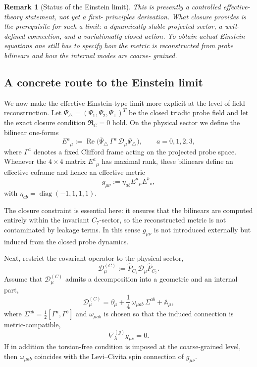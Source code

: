 \documentclass[12pt,a4paper]{article}
\newtheorem*{remark}{Remark}
\begin{document}
\begin{remark}[Status of the Einstein limit]
This is presently a controlled effective-theory statement, not yet a first-
principles derivation.
What closure provides is the prerequisite for such a limit: a dynamically
stable projected sector, a well-defined connection, and a variationally
closed action.
To obtain actual Einstein equations one still has to specify how the metric
is reconstructed from probe bilinears and how the internal modes are coarse-
grained.
\end{remark}


\subsection*{A concrete route to the Einstein limit}

We now make the effective Einstein-type limit more explicit at the level of
field reconstruction. Let $\Psi_\triangle=(\Psi_1,\Psi_2,\Psi_\perp)^T$ be the
closed triadic probe field and let the exact closure condition
$\mathfrak R_C=0$ hold. On the physical sector we define the bilinear one-forms
\[
  E^a{}_{\mu}
  := \operatorname{Re}\bigl(\bar\Psi_\triangle \,\Gamma^a \, \mathcal D_\mu
  \Psi_\triangle\bigr),
  \qquad a=0,1,2,3,
\]
where $\Gamma^a$ denotes a fixed Clifford frame acting on the projected probe
space. Whenever the $4\times 4$ matrix $E^a{}_{\mu}$ has maximal rank, these
bilinears define an effective coframe and hence an effective metric
\[
  g_{\mu\nu}
  := \eta_{ab} E^a{}_{\mu} E^b{}_{\nu},
\]
with $\eta_{ab}=\operatorname{diag}(-1,1,1,1)$.

The closure constraint is essential here: it ensures that the bilinears are
computed entirely within the invariant $C_7$-sector, so the reconstructed
metric is not contaminated by leakage terms. In this sense $g_{\mu\nu}$ is not
introduced externally but induced from the closed probe dynamics.

Next, restrict the covariant operator to the physical sector,
\[
  \mathcal D^{(C)}_\mu := \hat P_{C_7}\mathcal D_\mu \hat P_{C_7}.
\]
Assume that $\mathcal D^{(C)}_\mu$ admits a decomposition into a geometric and an
internal part,
\[
  \mathcal D^{(C)}_\mu
  = \partial_\mu + \frac14 \, \omega_{\mu ab}\,\Sigma^{ab} + \mathbb A_\mu,
\]
where $\Sigma^{ab}=\frac12[\Gamma^a,\Gamma^b]$ and $\omega_{\mu ab}$ is chosen so
that the induced connection is metric-compatible,
\[
  \nabla^{(g)}_\lambda g_{\mu\nu}=0.
\]
If in addition the torsion-free condition is imposed at the coarse-grained
level, then $\omega_{\mu ab}$ coincides with the Levi--Civita spin connection of
$g_{\mu\nu}$.
\end{document}
